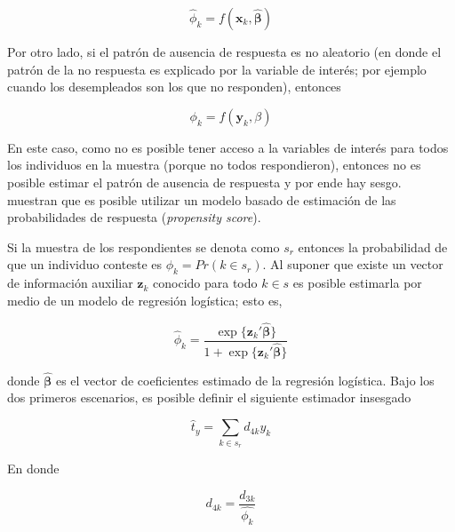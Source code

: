 \documentclass[
  10pt,
  spanish,
]{book}
\begin{document}
\[
\hat{\phi}_k = f(\mathbf{x}_k, \hat{\boldsymbol{\beta}})
\]

Por otro lado, si el patrón de ausencia de respuesta es no aleatorio (en donde el patrón de la no respuesta es explicado por la variable de interés; por ejemplo cuando los desempleados son los que no responden), entonces

\[
\phi_k = f(\mathbf{y}_k, \beta)
\]

En este caso, como no es posible tener acceso a la variables de interés para todos los individuos en la muestra (porque no todos respondieron), entonces no es posible estimar el patrón de ausencia de respuesta y por ende hay sesgo. \citet{Kim_Riddles_2012} muestran que es posible utilizar un modelo basado de estimación de las probabilidades de respuesta (\emph{propensity score}).

Si la muestra de los respondientes se denota como \(s_r\) entonces la probabilidad de que un individuo conteste es \(\phi_k = Pr(k \in s_r)\). Al suponer que existe un vector de información auxiliar \(\mathbf{z}_k\) conocido para todo \(k\in s\) es posible estimarla por medio de un modelo de regresión logística; esto es,

\[
\hat{\phi}_k = \frac{\exp\{\mathbf{z}_k'\hat{\boldsymbol{\beta}}\}}{1 + \exp\{\mathbf{z}_k'\hat{\boldsymbol{\beta}}\}}
\]

donde \(\hat{\mathbf{\beta}}\) es el vector de coeficientes estimado de la regresión logística. Bajo los dos primeros escenarios, es posible definir el siguiente estimador insesgado

\[
\hat{t}_y=\sum_{k\in s_r}d_{4k}y_k
\]

En donde

\[
d_{4k} = \frac{d_{3k}}{\hat{\phi_k}}
\]
\end{document}

